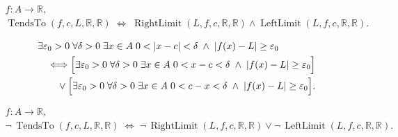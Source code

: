 \begin{remark*}
\[
\begin{aligned}
  f\colon A\to\mathbb{R},\\
  \operatorname{TendsTo}(f,c,L,\mathbb{R},\mathbb{R})
  \;\Longleftrightarrow\;
  \operatorname{RightLimit}(L,f,c,\mathbb{R},\mathbb{R})\wedge\operatorname{LeftLimit}(L,f,c,\mathbb{R},\mathbb{R}).
\end{aligned}
\]
\end{remark*}

\begin{remark*}
\[
\begin{aligned}
&\exists\varepsilon_0>0\;\forall\delta>0\;\exists x\in A\;
  0<|x-c|<\delta\;\wedge\; |f(x)-L|\geq\varepsilon_0 \\
&\quad\Longleftrightarrow
\Bigl[\exists\varepsilon_0>0\;\forall\delta>0\;\exists x\in A\;
  0<x-c<\delta\;\wedge\; |f(x)-L|\geq\varepsilon_0\Bigr] \\
&\qquad\vee
\Bigl[\exists\varepsilon_0>0\;\forall\delta>0\;\exists x\in A\;
  0<c-x<\delta\;\wedge\; |f(x)-L|\geq\varepsilon_0\Bigr].
\end{aligned}
\]
\end{remark*}

\begin{remark*}
\[
\begin{aligned}
  f\colon A\to\mathbb{R},\\
  \neg\,\operatorname{TendsTo}(f,c,L,\mathbb{R},\mathbb{R})
  \;\Longleftrightarrow\;
  \neg\,\operatorname{RightLimit}(L,f,c,\mathbb{R},\mathbb{R})\vee\neg\,\operatorname{LeftLimit}(L,f,c,\mathbb{R},\mathbb{R}).
\end{aligned}
\]
\end{remark*}

